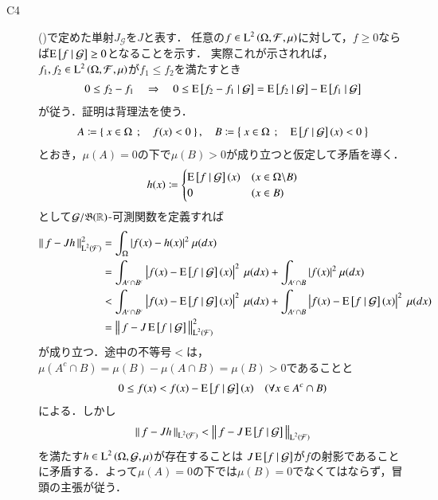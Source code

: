 \begin{prf}
\begin{description}
				
			\item[C4] ()で定めた単射$J_{\mathcal{G}}$を$J$と表す．
				任意の$f \in \operatorname{L}^{2} \left(\Omega, \mathcal{F},\mu\right)$に対して，$f \geq 0$ならば$\operatorname{E} \left[ f \ \middle|\ \mathcal{G} \right] \geq 0$となることを示す．
				実際これが示されれば，$f_1,f_2 \in \operatorname{L}^{2} \left(\Omega, \mathcal{F},\mu\right)$が$f_1 \leq f_2$を満たすとき
				\begin{align}
					0 \leq f_2 - f_1 \quad \Rightarrow \quad 0 \leq \operatorname{E} \left[ f_2 - f_1 \ \middle|\ \mathcal{G} \right] = \operatorname{E} \left[ f_2 \ \middle|\ \mathcal{G} \right] - \operatorname{E} \left[ f_1 \ \middle|\ \mathcal{G} \right]
				\end{align}
				が従う．証明は背理法を使う．
				\begin{align}
					A \coloneqq \left\{\ x \in \Omega\ \, ; \quad f(x) < 0\ \right\}, \quad
					B \coloneqq \left\{\ x \in \Omega\ \, ; \quad \operatorname{E} \left[ f \ \middle|\ \mathcal{G} \right](x) < 0\ \right\}
				\end{align}
				とおき，$\mu(A)=0$の下で$\mu(B) > 0$が成り立つと仮定して矛盾を導く．
				\begin{align}
					h(x) \coloneqq
					\begin{cases}
						\operatorname{E} \left[ f \ \middle|\ \mathcal{G} \right](x) & (x \in \Omega \backslash B) \\
						0 & (x \in B)
					\end{cases}
				\end{align}
				として$\mathcal{G}/\mathfrak{B}(\mathbb{R})$-可測関数を定義すれば
				\begin{align}
					\Norm{f - Jh}{\Lp{2}{\mathcal{F}}}^2 
					&= \int_{\Omega} |f(x) - h(x)|^2\ \mu(dx) \\
					&= \int_{A^c \cap B^c} \left|f(x) - \cexp{f}{\mathcal{G}}(x)\right|^2\ \mu(dx) + \int_{A^c \cap B} |f(x)|^2\ \mu(dx) \\
					&< \int_{A^c \cap B^c} \left|f(x) - \cexp{f}{\mathcal{G}}(x)\right|^2\ \mu(dx) + \int_{A^c \cap B} \left|f(x) - \cexp{f}{\mathcal{G}}(x)\right|^2\ \mu(dx) \\
					&= \Norm{f - J\cexp{f}{\mathcal{G}}}{\Lp{2}{\mathcal{F}}}^2
				\end{align}
				が成り立つ．途中の不等号$<$は，$\mu(A^c \cap B) = \mu(B) - \mu(A \cap B) = \mu(B) > 0$であることと
				\begin{align}
					0 \leq f(x) < f(x) - \operatorname{E} \left[ f \ \middle|\ \mathcal{G} \right](x) \quad (\forall x \in A^c \cap B)
				\end{align}
				による．しかし
				\begin{align}
					\left\|\, f - Jh\, \right\|_{\operatorname{L}^{2} \left(\mathcal{F}\right)} < \left\|\, f - J\operatorname{E} \left[ f \ \middle|\ \mathcal{G} \right]\, \right\|_{\operatorname{L}^{2} \left(\mathcal{F}\right)}
				\end{align}
				を満たす$h \in \operatorname{L}^{2} \left(\Omega, \mathcal{G},\mu\right)$が存在することは
				$J\operatorname{E} \left[ f \ \middle|\ \mathcal{G} \right]$が$f$の射影であることに矛盾する．よって$\mu(A) = 0$の下では$\mu(B) = 0$でなくてはならず，冒頭の主張が従う．
			

\end{description}
\end{prf}
